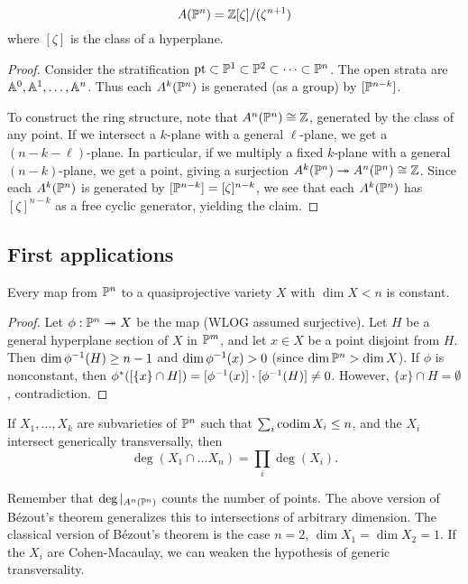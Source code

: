 \documentclass{article}
\begin{document}
\begin{prop}
	\[
		A(\PP^n) = \ZZ[\zeta] / (\zeta^{n+1})
	\]
	where $[\zeta]$ is the class of a hyperplane.
\end{prop}

\begin{proof}
	Consider the stratification $\pt \subset \PP^1 \subset \PP^2 \subset \dots \subset \PP^n$.
	The open strata are $\AA^0, \AA^1, \dots, \AA^n$.
	Thus each $A^k(\PP^n)$ is generated (as a group) by $[\PP^{n-k}]$.

	To construct the ring structure, note that $A^n(\PP^n) \cong \ZZ$, generated by the class of any point.
	If we intersect a $k$-plane with a general $\ell$-plane, we get a $(n-k-\ell)$-plane.
	In particular, if we multiply a fixed $k$-plane with a general $(n-k)$-plane, we get a point, giving a surjection $A^k(\PP^n) \twoheadrightarrow A^n(\PP^n) \cong \ZZ$.
	Since each $A^k(\PP^n)$ is generated by $[\PP^{n-k}] = [\zeta]^{n-k}$, we see that each $A^k(\PP^n)$ has $[\zeta]^{n-k}$ as a free cyclic generator, yielding the claim.
\end{proof}

\subsection{First applications}

\begin{cor}
	Every map from $\PP^n$ to a quasiprojective variety $X$ with $\dim X < n$ is constant.
\end{cor}

\begin{proof}
	Let $\phi: \PP^n \twoheadrightarrow X$ be the map (WLOG assumed surjective).
	Let $H$ be a general hyperplane section of $X$ in $\PP^m$, and let $x \in X$ be a point disjoint from $H$.
	Then $\dim \phi\inv(H) \geq n-1$ and $\dim \phi\inv(x) > 0$ (since $\dim \PP^n > \dim X$).
	If $\phi$ is nonconstant, then $\phi^*([\{x\} \cap H]) = [\phi\inv(x)] \cdot [\phi\inv(H)] \neq 0$.
	However, $\{x\} \cap H = \emptyset$, contradiction.
\end{proof}

\begin{thm}[B\'ezout]
	If $X_1, \dots, X_k$ are subvarieties of $\PP^n$ such that $\sum_i \codim X_i \leq n$, and the $X_i$ intersect generically transversally, then
	\[
		\deg (X_1 \cap \dots X_n) = \prod_i \deg (X_i).
	\]
\end{thm}

Remember that $\deg|_{A^n(\PP^n)}$ counts the number of points.
The above version of B\'ezout's theorem generalizes this to intersections of arbitrary dimension.
The classical version of B\'ezout's theorem is the case $n = 2$, $\dim X_1 = \dim X_2 = 1$.
If the $X_i$ are Cohen-Macaulay, we can weaken the hypothesis of generic transversality.
\end{document}
